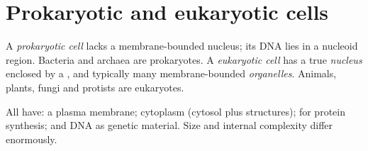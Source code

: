 \section{Prokaryotic and eukaryotic cells}

\begin{definition}\label{def:g10:the-cell:prok-euk}
A \emph{prokaryotic cell}
lacks a membrane-bounded nucleus; its DNA lies in a nucleoid region.
Bacteria and archaea are prokaryotes. A \emph{eukaryotic
cell} has a true
\emph{nucleus} enclosed by a ,
and typically many membrane-bounded \emph{organelles}.
Animals, plants, fungi and protists are eukaryotes.
\end{definition}

\begin{proposition}\label{prop:g10:the-cell:shared}
All  have: a plasma membrane; cytoplasm (cytosol plus structures);
 for protein synthesis; and DNA as genetic material. Size and
internal complexity differ enormously.
\end{proposition}
\admitted

